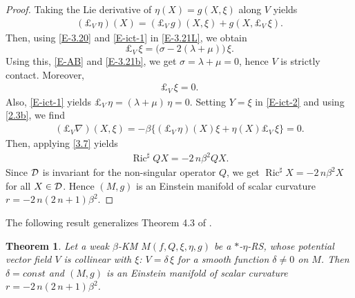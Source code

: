 \documentclass[11pt,a4paper,twoside]{article}
\newtheorem{theorem}{Theorem}%
\def\Ric{\operatorname{Ric}}
\begin{document}
{\begin{proof}
Taking the Lie derivative of $\eta(X)=g(X,\xi)$ along $V$ yields
\begin{align}\label{E-3.21L}
 (\pounds_V\,\eta)(X) = (\pounds_V\,g)(X,\xi) + g(X, \pounds_V\,\xi) .
\end{align}
Then, using \eqref{E-3.20} and \eqref{E-ict-1} in \eqref{E-3.21L}, we obtain
\[
 \pounds_V\,\xi = \big(\sigma- 2(\lambda+\mu)\big)\,\xi.
\]
Using this, \eqref{E-AB} and \eqref{E-3.21b}, we get $\sigma=\lambda+\mu=0$, hence $V$ is strictly contact.
Moreover,
\begin{align*}%
 \pounds_V\,\xi = 0.
\end{align*}
Also, \eqref{E-ict-1} yields  $\pounds_V\,\eta=(\lambda+\mu)\,\eta=0$.
Setting $Y=\xi$ in \eqref{E-ict-2} and using \eqref{2.3b}, we find
\begin{align}\label{E-ict-3}
 (\pounds_V\nabla)(X,\xi) = -\beta\{(\pounds_V\,\eta)(X)\xi + \eta(X)\pounds_V\,\xi\} = 0.
\end{align}
Then, applying \eqref{3.7} yields
\begin{align*}%
 \Ric^\sharp QX = - 2\,n\beta^2 QX .
\end{align*}
Since ${\cal D}$ is invariant for the non-singular operator $Q$, we get $\Ric^\sharp X = - 2\,n\beta^2 X$ for all $X\in{\cal D}$.
Hence $(M, g)$ is an Einstein manifold of scalar curvature ${r}=-2\,n(2\,n+1)\beta^2$.
\end{proof}

The following result generalizes Theorem 4.3 of \cite{ven-2022}.

\begin{theorem}\label{T-004}
Let a weak $\beta$-KM $M({f},Q,\xi,\eta,g)$ be a $\ast$-$\eta$-RS, whose potential vector field $V$ is collinear with $\xi$:
$V=\delta\,\xi$ for a smooth function $\delta\ne0$ on $M$. Then $\delta=const$ and $(M, g)$ is an
Einstein manifold of scalar curvature ${r}=-2\,n(2\,n+1)\beta^2$.
\end{theorem}

}
\end{document}
